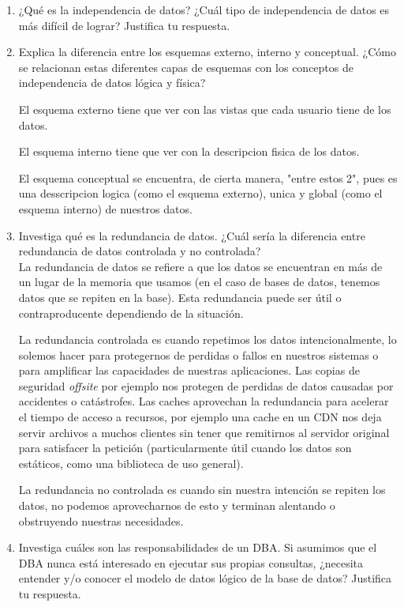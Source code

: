 \documentclass[12pt,a4paper]{article}
\begin{document}
\begin{enumerate}
\begin{enumerate}
			\item ¿Qué es la independencia de datos? ¿Cuál tipo de independencia de datos es más difícil de lograr?
				Justifica tu respuesta.

			\item Explica la diferencia entre los esquemas externo, interno y conceptual. ¿Cómo se relacionan estas
				diferentes capas de esquemas con los conceptos de independencia de datos lógica y física?

				El esquema externo tiene que ver con las vistas que cada usuario tiene de los datos.
				
				El esquema interno tiene que ver con la descripcion fisica de los datos.
				
				El esquema conceptual se encuentra, de cierta manera, "entre estos 2", pues es una desscripcion logica 
				(como el esquema externo), unica y global (como el esquema interno) de nuestros datos.

			\item Investiga qué es la redundancia de datos. ¿Cuál sería la diferencia entre redundancia de datos
				controlada y no controlada?\\

				La redundancia de datos se refiere a que los datos se encuentran en más de un lugar de
				la memoria que usamos (en el caso de bases de datos, tenemos datos que se repiten en la base).
				Esta redundancia puede ser útil o contraproducente dependiendo de la situación.

				La redundancia controlada es cuando repetimos los datos intencionalmente, lo solemos
				hacer para protegernos de perdidas o fallos en nuestros sistemas o para amplificar las
				capacidades de nuestras aplicaciones.
				Las copias de seguridad \textit{offsite} por ejemplo nos protegen de perdidas de datos
				causadas por accidentes o catástrofes.
				Las caches aprovechan la redundancia para acelerar el tiempo de acceso a recursos,
				por ejemplo una cache en un CDN nos deja servir archivos a muchos clientes sin
				tener que remitirnos al servidor original para satisfacer la petición
				(particularmente útil cuando los datos son estáticos, como una biblioteca de uso general).

				La redundancia no controlada es cuando sin nuestra intención se repiten los datos,
				no podemos aprovecharnos de esto y terminan alentando o obstruyendo nuestras necesidades.

			\item Investiga cuáles son las responsabilidades de un DBA. Si asumimos que el DBA nunca está interesado
				en ejecutar sus propias consultas, ¿necesita entender y/o conocer el modelo de datos lógico de la
				base de datos? Justifica tu respuesta.


\end{enumerate}
\end{enumerate}
\end{document}
